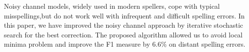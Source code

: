 Noisy channel models, widely used in modern spellers, cope with typical misspellings,but do not work well with infrequent and difficult spelling errors. In this paper, we have improved the noisy channel approach by iterative stochastic search for the best correction. The proposed algorithm allowed us to avoid local minima problem and improve the F1 measure by 6.6\% on distant spelling errors.
